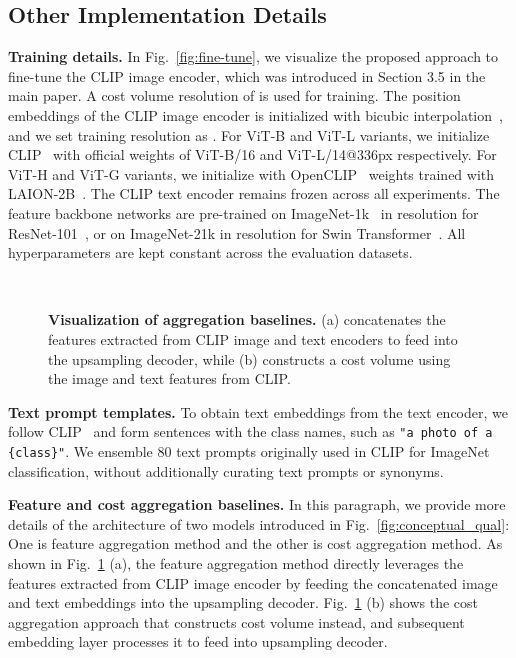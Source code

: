 \documentclass[10pt,twocolumn,letterpaper]{article}
\begin{document}
\subsection{Other Implementation Details}
\smallbreak
\noindent\textbf{Training details.}
In Fig.~\ref{fig:fine-tune}, we visualize the proposed approach to fine-tune the CLIP image encoder, which was introduced in Section 3.5 in the main paper. A cost volume resolution of  is used for training. The position embeddings of the CLIP image encoder is initialized with bicubic interpolation~\cite{touvron2021training}, and we set training resolution as . For ViT-B and ViT-L variants, we initialize CLIP~\cite{radford2021learning} with official weights of ViT-B/16 and ViT-L/14@336px respectively. For ViT-H and ViT-G variants, we initialize with OpenCLIP~\cite{cherti2022reproducible} weights trained with LAION-2B~\cite{schuhmann2022laion}. The CLIP text encoder remains frozen across all experiments. The feature backbone networks are pre-trained on ImageNet-1k~\cite{deng2009imagenet} in  resolution for ResNet-101~\cite{he2016deep}, or on ImageNet-21k in  resolution for Swin Transformer~\cite{liu2021swin}. All hyperparameters are kept constant across the evaluation datasets.  


\begin{figure}[t]
  \centering
  \renewcommand{\thesubfigure}{}
     \hfill
     \hfill\\

\vspace{-10pt}
\caption{\textbf{Visualization of aggregation baselines.} (a) concatenates the features extracted from CLIP image and text encoders to feed into the upsampling decoder, while (b) constructs a cost volume using the image and text features from CLIP. }
\vspace{-5pt}
  \label{fig:baseline}
\end{figure} \smallbreak
\noindent\textbf{Text prompt templates.}
To obtain text embeddings from the text encoder, we follow CLIP~\cite{radford2021learning} and form sentences with the class names, such as \texttt{"a photo of a \{class\}"}. We ensemble 80 text prompts originally used in CLIP for ImageNet classification, without additionally curating text prompts or synonyms.

\smallbreak
\noindent\textbf{Feature and cost aggregation baselines.}
In this paragraph, we provide more details of the architecture of two models introduced in Fig.~\ref{fig:conceptual_qual}: One is feature aggregation method and the other is cost aggregation method. As shown in Fig.~\ref{fig:baseline} (a), the feature aggregation method directly leverages the features extracted from CLIP image encoder by feeding the concatenated image and text embeddings into the upsampling decoder. Fig.~\ref{fig:baseline} (b) shows the cost aggregation approach that constructs cost volume instead, and subsequent embedding layer processes it to feed into upsampling decoder. 
\end{document}
